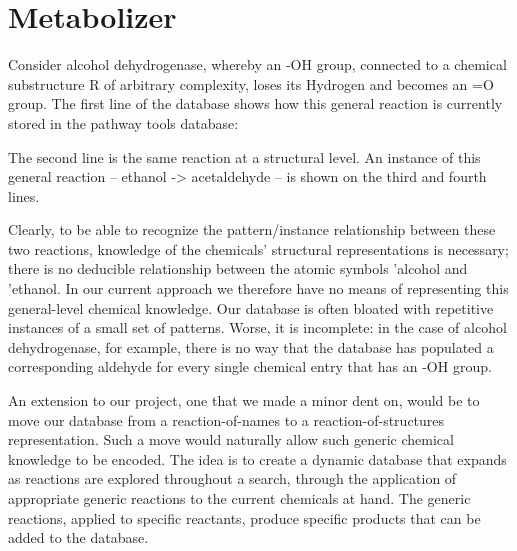 \section{Metabolizer}

Consider alcohol dehydrogenase, whereby an -OH group, connected to
a chemical substructure R of arbitrary complexity, loses its Hydrogen
and becomes an =O group. The first line of the database shows how
this general reaction is currently stored in the pathway tools database:

\vspace{.1in}


\vspace{.1in}

The second line is the same reaction at a structural level. An instance
of this general reaction -- ethanol -> acetaldehyde -- is shown on
the third and fourth lines.

Clearly, to be able to recognize the pattern/instance relationship
between these two reactions, knowledge of the chemicals' structural
representations is necessary; there is no deducible relationship between
the atomic symbols 'alcohol and 'ethanol. In our current approach
we therefore have no means of representing this general-level chemical
knowledge. Our database is often bloated with repetitive instances
of a small set of patterns. Worse, it is incomplete: in the case of
alcohol dehydrogenase, for example, there is no way that the database
has populated a corresponding aldehyde for every single chemical entry
that has an -OH group.

An extension to our project, one that we made a minor dent on, would
be to move our database from a reaction-of-names to a reaction-of-structures
representation. Such a move would naturally allow such generic chemical
knowledge to be encoded. The idea is to create a dynamic database
that expands as reactions are explored throughout a search, through
the application of appropriate generic reactions to the current chemicals
at hand. The generic reactions, applied to specific reactants, produce
specific products that can be added to the database.

